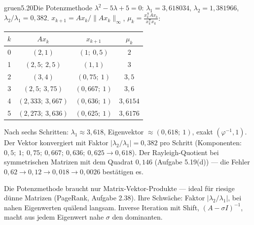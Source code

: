 \begin{loesungkarte}{gruen}{5.20}{Die Potenzmethode}
$\lambda^{2} - 5\lambda + 5 = 0$: $\lambda_1 = 3{,}618034$, $\lambda_2 = 1{,}381966$, $\lambda_2/\lambda_1 = 0{,}382$.
$x_{k+1} = Ax_k/\|Ax_k\|_\infty$, $\mu_k = \frac{x_k^{\mathsf T}Ax_k}{x_k^{\mathsf T}x_k}$:
\begin{center}\small
\begin{tabular}{c|ccc}
$k$ & $Ax_k$ & $x_{k+1}$ & $\mu_k$\\ \hline
0 & $(2, 1)$ & $(1;\ 0{,}5)$ & $2$\\
1 & $(2{,}5;\ 2{,}5)$ & $(1, 1)$ & $3$\\
2 & $(3, 4)$ & $(0{,}75;\ 1)$ & $3{,}5$\\
3 & $(2{,}5;\ 3{,}75)$ & $(0{,}667;\ 1)$ & $3{,}6$\\
4 & $(2{,}333;\ 3{,}667)$ & $(0{,}636;\ 1)$ & $3{,}6154$\\
5 & $(2{,}273;\ 3{,}636)$ & $(0{,}625;\ 1)$ & $3{,}6176$
\end{tabular}
\end{center}
Nach sechs Schritten: $\lambda_1\approx3{,}618$, Eigenvektor $\approx(0{,}618;\ 1)$, exakt $(\varphi^{-1}, 1)$.
Der Vektor konvergiert mit Faktor $|\lambda_2/\lambda_1| = 0{,}382$ pro Schritt (Komponenten: $0{,}5;\ 1;\ 0{,}75;\ 0{,}667;\ 0{,}636;\ 0{,}625\to0{,}618$). Der Rayleigh-Quotient bei symmetrischen Matrizen mit dem Quadrat $0{,}146$ (Aufgabe 5.19(d)) --- die Fehler $0{,}62\to0{,}12\to0{,}018\to0{,}0026$ bestätigen es.
\begin{mitnehmen}\kastentext
Die Potenzmethode braucht nur Matrix-Vektor-Produkte --- ideal für riesige dünne Matrizen (PageRank, Aufgabe 2.38). Ihre Schwäche: Faktor $|\lambda_2/\lambda_1|$, bei nahen Eigenwerten quälend langsam. Inverse Iteration mit Shift, $(A - \sigma I)^{-1}$, macht aus jedem Eigenwert nahe $\sigma$ den dominanten.
\end{mitnehmen}
\end{loesungkarte}

